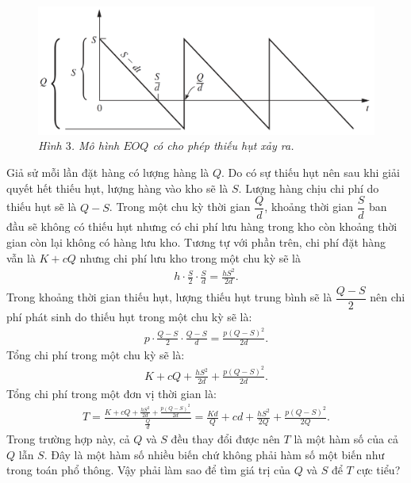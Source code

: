 \begin{multicols}{2}
	\begin{figure}[H]
		\vspace*{-5pt}
		\centering
		\captionsetup{labelformat= empty, justification=centering}
		\includegraphics[width= 1\linewidth]{4}
		\caption{\small\textit{\color{toanhocdoisong}Hình $3$. Mô hình $EOQ$ có cho phép thiếu hụt xảy ra.}}
		\vspace*{-10pt}
	\end{figure}
	Giả sử mỗi lần đặt hàng có lượng hàng là $Q$. Do có sự thiếu hụt nên sau khi giải quyết hết thiếu hụt, lượng hàng vào kho sẽ là $S$. Lượng hàng chịu chi phí do thiếu hụt sẽ là $Q-S$. Trong một chu kỳ thời gian $\dfrac{Q}{d}$, khoảng thời gian $\dfrac{S}{d}$ ban đầu sẽ không có thiếu hụt nhưng có chi phí lưu hàng trong kho còn khoảng thời gian còn lại không có hàng lưu kho.
	\vskip 0.1cm
	Tương tự với phần trên, chi phí đặt hàng vẫn là $K+cQ$ nhưng chi phí lưu kho trong một chu kỳ sẽ là
	\begin{align*}
		h\cdot\frac{S}{2}\cdot\frac{S}{d} = \frac{hS^2}{2d}.
	\end{align*}
	Trong khoảng thời gian thiếu hụt, lượng thiếu hụt trung bình sẽ là $\dfrac{Q-S}{2}$ nên chi phí phát sinh do thiếu hụt trong một chu kỳ sẽ là:
	\begin{align*}
		p\cdot\frac{Q-S}{2}\cdot\frac{Q-S}{d} = \frac{p(Q-S)^2}{2d}.
	\end{align*}
	Tổng chi phí trong một chu kỳ sẽ là:
	\begin{align*}
		K + cQ + \frac{hS^2}{2d} + \frac{p(Q-S)^2}{2d}.
	\end{align*}
	Tổng chi phí trong một đơn vị thời gian là:
	\begin{align*}
		T = \frac{K + cQ + \frac{hS^2}{2d} + \frac{p(Q-S)^2}{2d}}{\frac{Q}{d}} = \frac{Kd}{Q} + cd + \frac{hS^2}{2Q} + \frac{p(Q-S)^2}{2Q}.
	\end{align*}
	Trong trường hợp này, cả $Q$ và $S$ đều thay đổi được nên $T$ là một hàm số của cả $Q$ lẫn $S$. Đây là một hàm số nhiều biến chứ không phải hàm số một biến như trong toán phổ thông. Vậy phải làm sao để tìm giá trị của $Q$ và $S$ để $T$ cực tiểu?

\end{multicols}
